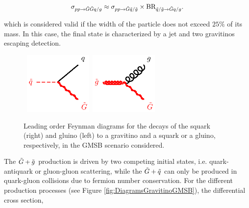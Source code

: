 \begin{equation}
\sigma_{\pp \rightarrow \gravino \gravino q/g} \approx \sigma_{\pp \rightarrow \gravino \squark/\gluino} \times \text{BR}_{\squark/\gluino \rightarrow \gravino q/g}.
\label{eq:SUSYGMSBNWAFactorization}
\end{equation}

\noindent which is considered valid if the width of the particle does not exceed $25\%$ of its mass.
In this case, the final state is characterized by a jet and two gravitinos escaping detection.

\begin{figure}[!t]
\begin{center}
\mbox{
\includegraphics[width=0.3\textwidth]{BeyondSM/Figures/sqqN.eps}
\includegraphics[width=0.3\textwidth]{BeyondSM/Figures/glgN.eps}
}
\mbox{
}
\end{center}
\caption[Feynman diagrams for the squark and gluino decays in GMSB scenarios.]{Leading order Feynman diagrams for the decays of the squark (right) and gluino (left) to a gravitino and a squark or a gluino, respectively, in the GMSB scenario considered.}
\label{fig:DiagramsVertexGravitinoGMSB}
\end{figure}

The $\tilde{G} + \tilde{g}$ production is driven by two competing initial states, i.e. quark-antiquark or gluon-gluon scattering, while the $\tilde{G} + \tilde{q}$ can only be produced in quark-gluon collisions due to fermion number conservation.
For the different production processes (see Figure \ref{fig:DiagramsGravitinoGMSB}), the differential cross section,

